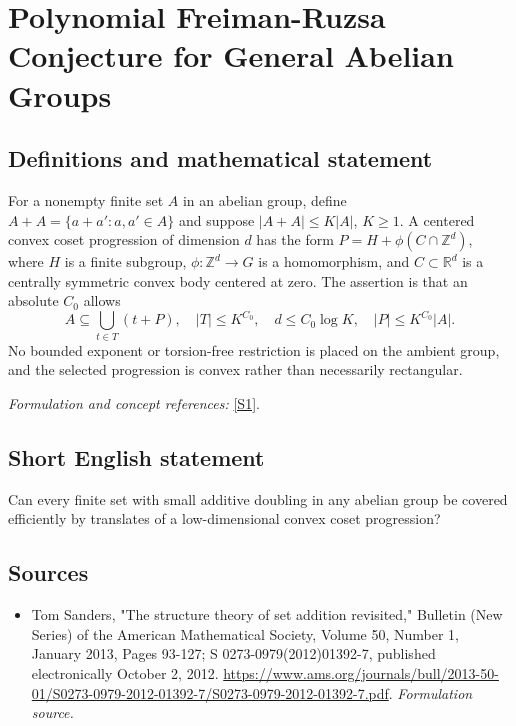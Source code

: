 \documentclass[11pt]{article}
\begin{document}
\section*{\texorpdfstring{Polynomial Freiman-Ruzsa Conjecture for General Abelian Groups}{Polynomial Freiman-Ruzsa Conjecture for General Abelian Groups}}\label{195}
\subsection{Definitions and mathematical statement}
For a nonempty finite set $A$ in an abelian group, define $A+A=\{a+a':a,a'\in A\}$ and suppose $|A+A|\le K|A|$, $K\ge1$. A centered convex coset progression of dimension $d$ has the form
$P=H+\phi(C\cap{\mathbb{Z}}^d)$, where $H$ is a finite subgroup, $\phi:{\mathbb{Z}}^d\to G$ is a homomorphism, and $C\subset{\mathbb{R}}^d$ is a centrally symmetric convex body centered at zero. The assertion is that an absolute $C_0$ allows
\[
 A\subseteq\bigcup_{t\in T}(t+P),\quad |T|\le K^{C_0},
 \quad d\le C_0\log K,\quad |P|\le K^{C_0}|A|.
\]
No bounded exponent or torsion-free restriction is placed on the ambient group, and the selected progression is convex rather than necessarily rectangular.
\par\smallskip\textit{Formulation and concept references:} \href{https://www.ams.org/journals/bull/2013-50-01/S0273-0979-2012-01392-7/S0273-0979-2012-01392-7.pdf}{[S1]}.

\subsection{Short English statement}
Can every finite set with small additive doubling in any abelian group be covered efficiently by translates of a low-dimensional convex coset progression?
\subsection{Sources}
\begin{itemize}
\item[S1]Tom Sanders, "The structure theory of set addition revisited," Bulletin (New Series) of the American Mathematical Society, Volume 50, Number 1, January 2013, Pages 93-127; S 0273-0979(2012)01392-7, published electronically October 2, 2012.
\url{https://www.ams.org/journals/bull/2013-50-01/S0273-0979-2012-01392-7/S0273-0979-2012-01392-7.pdf}.
\textit{Formulation source.}
\end{itemize}
\end{document}
